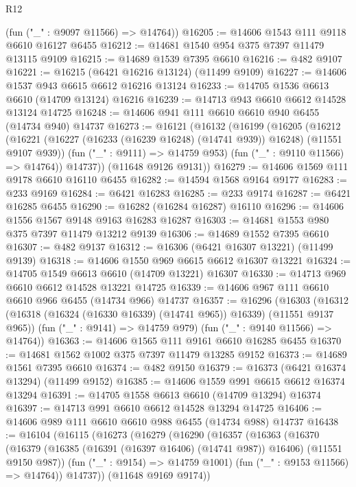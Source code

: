 \begin{lexlean}{R12}
\begin{coremodule}
{{{{{{{{{{{{{{{{{{{{{{{{{{{{{{{{{{{{{{{{{{{{{{{{{{{{{{{{{{{{{{{{{{{{{{{{{{{{{{{{{{      (fun ("_" : @9097 @11566) => @14764))
@16205 := @14606 @1543 @111 @9118 @6610 @16127 @6455
@16212 := @14681 @1540 @954 @375 @7397 @11479 @13115 @9109
@16215 := @14689 @1539 @7395 @6610
@16216 := @482 @9107
@16221 := @16215 (@6421 @16216 @13124) (@11499 @9109)
@16227 := @14606 @1537 @943 @6615 @6612 @16216 @13124
@16233 := @14705 @1536 @6613 @6610 (@14709 @13124) @16216
@16239 := @14713 @943 @6610 @6612 @14528 @13124 @14725
@16248 := @14606 @941 @111 @6610 @6610 @940 @6455 (@14734 @940) @14737
@16273 := @16121
    (@16132
      (@16199
        (@16205
          (@16212
            (@16221 (@16227 (@16233 (@16239 @16248) (@14741 @939)) @16248) (@11551 @9107 @939))
            (fun ("_" : @9111) => @14759 @953)
            (fun ("_" : @9110 @11566) => @14764))
          @14737))
      (@11648 @9126 @9131))
@16279 := @14606 @1569 @111 @9178 @6610 @16110 @6455
@16282 := @14594 @1568 @9164 @9177
@16283 := @233 @9169
@16284 := @6421 @16283
@16285 := @233 @9174
@16287 := @6421 @16285 @6455
@16290 := @16282 (@16284 @16287) @16110
@16296 := @14606 @1556 @1567 @9148 @9163 @16283 @16287
@16303 := @14681 @1553 @980 @375 @7397 @11479 @13212 @9139
@16306 := @14689 @1552 @7395 @6610
@16307 := @482 @9137
@16312 := @16306 (@6421 @16307 @13221) (@11499 @9139)
@16318 := @14606 @1550 @969 @6615 @6612 @16307 @13221
@16324 := @14705 @1549 @6613 @6610 (@14709 @13221) @16307
@16330 := @14713 @969 @6610 @6612 @14528 @13221 @14725
@16339 := @14606 @967 @111 @6610 @6610 @966 @6455 (@14734 @966) @14737
@16357 := @16296
    (@16303
      (@16312 (@16318 (@16324 (@16330 @16339) (@14741 @965)) @16339) (@11551 @9137 @965))
      (fun ("_" : @9141) => @14759 @979)
      (fun ("_" : @9140 @11566) => @14764))
@16363 := @14606 @1565 @111 @9161 @6610 @16285 @6455
@16370 := @14681 @1562 @1002 @375 @7397 @11479 @13285 @9152
@16373 := @14689 @1561 @7395 @6610
@16374 := @482 @9150
@16379 := @16373 (@6421 @16374 @13294) (@11499 @9152)
@16385 := @14606 @1559 @991 @6615 @6612 @16374 @13294
@16391 := @14705 @1558 @6613 @6610 (@14709 @13294) @16374
@16397 := @14713 @991 @6610 @6612 @14528 @13294 @14725
@16406 := @14606 @989 @111 @6610 @6610 @988 @6455 (@14734 @988) @14737
@16438 := @16104
    (@16115
      (@16273
        (@16279
          (@16290
            (@16357
              (@16363
                (@16370
                  (@16379
                    (@16385 (@16391 (@16397 @16406) (@14741 @987)) @16406)
                    (@11551 @9150 @987))
                  (fun ("_" : @9154) => @14759 @1001)
                  (fun ("_" : @9153 @11566) => @14764))
                @14737))
            (@11648 @9169 @9174))
}}}}}}}}}}}}}}}}}}}}}}}}}}}}}}}}}}}}}}}}}}}}}}}}}}}}}}}}}}}}}}}}}}}}}}}}}}}}}}}}}}
\end{coremodule}
\end{lexlean}
